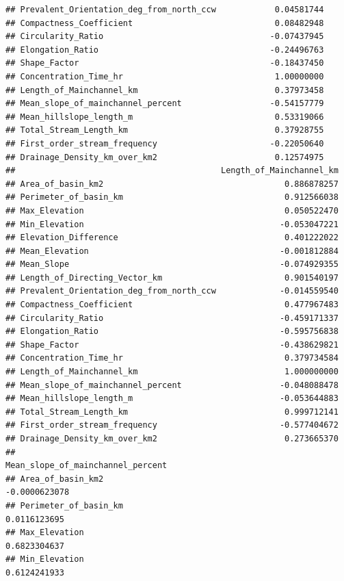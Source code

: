 \documentclass[11pt,]{article}
\begin{document}
\begin{verbatim}
## Prevalent_Orientation_deg_from_north_ccw            0.04581744
## Compactness_Coefficient                             0.08482948
## Circularity_Ratio                                  -0.07437945
## Elongation_Ratio                                   -0.24496763
## Shape_Factor                                       -0.18437450
## Concentration_Time_hr                               1.00000000
## Length_of_Mainchannel_km                            0.37973458
## Mean_slope_of_mainchannel_percent                  -0.54157779
## Mean_hillslope_length_m                             0.53319066
## Total_Stream_Length_km                              0.37928755
## First_order_stream_frequency                       -0.22050640
## Drainage_Density_km_over_km2                        0.12574975
##                                          Length_of_Mainchannel_km
## Area_of_basin_km2                                     0.886878257
## Perimeter_of_basin_km                                 0.912566038
## Max_Elevation                                         0.050522470
## Min_Elevation                                        -0.053047221
## Elevation_Difference                                  0.401222022
## Mean_Elevation                                       -0.001812884
## Mean_Slope                                           -0.074929355
## Length_of_Directing_Vector_km                         0.901540197
## Prevalent_Orientation_deg_from_north_ccw             -0.014559540
## Compactness_Coefficient                               0.477967483
## Circularity_Ratio                                    -0.459171337
## Elongation_Ratio                                     -0.595756838
## Shape_Factor                                         -0.438629821
## Concentration_Time_hr                                 0.379734584
## Length_of_Mainchannel_km                              1.000000000
## Mean_slope_of_mainchannel_percent                    -0.048088478
## Mean_hillslope_length_m                              -0.053644883
## Total_Stream_Length_km                                0.999712141
## First_order_stream_frequency                         -0.577404672
## Drainage_Density_km_over_km2                          0.273665370
##                                          Mean_slope_of_mainchannel_percent
## Area_of_basin_km2                                            -0.0000623078
## Perimeter_of_basin_km                                         0.0116123695
## Max_Elevation                                                 0.6823304637
## Min_Elevation                                                 0.6124241933

\end{verbatim}
\end{document}
